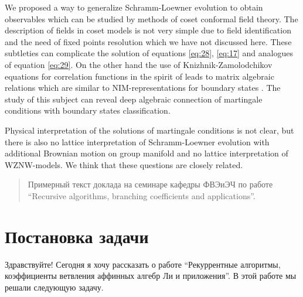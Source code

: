 We proposed a way to generalize Schramm-Loewner evolution to obtain observables which can be studied by methods of coset conformal field theory. The description of fields in coset models is not very simple due to field identification \cite{schellekens1990field} and the need of  fixed points resolution \cite{Fuchs:1996dd,fuchs1996resolution} which we have not discussed here. These subtleties can complicate the solution of equations  \eqref{eq:28}, \eqref{eq:17} and analogues of equation \eqref{eq:29}. On the other hand the use of Knizhnik-Zamolodchikov equations \cite{kogan1997knizhnik} for correlation functions in the spirit of \cite{alekseev2010sle} leads to matrix algebraic relations which are similar to NIM-representations for boundary states \cite{ishikawa2003novel}. The study of this subject can reveal deep algebraic connection of martingale conditions with boundary states classification. 

Physical interpretation of the solutions of martingale conditions is not clear, but there is also no lattice interpretation of Schramm-Loewner evolution with additional Brownian motion on group manifold \cite{bettelheim2005stochastic} and no lattice interpretation of WZNW-models. We think that these questions are closely related.






\newenvironment{comment}
{\par\noindent{\bf Для заинтересованных читателей}\\}
{\\\setlength{10cm}\\\hfill$\scriptstyle\blacksquare$\par}


\begin{abstract}
Примерный текст доклада на семинаре кафедры ФВЭиЭЧ по работе ``Recursive algorithms, branching coefficients and applications''.
\end{abstract}

\section{Постановка задачи}
\label{sec:task}

Здравствуйте!
Сегодня я хочу рассказать о работе ``Рекуррентные алгоритмы, коэффициенты ветвления аффинных алгебр
Ли и приложения''. В этой работе мы решали следующую задачу.

